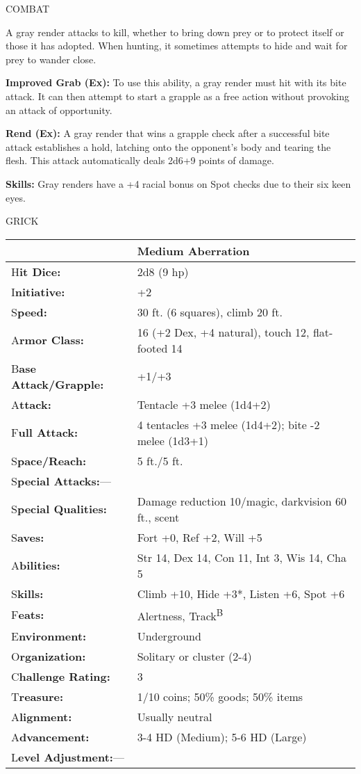 \documentclass{article}
\begin{document}
COMBAT

A gray render attacks to kill, whether to bring down prey or to protect itself 
or those it has adopted. When hunting, it sometimes attempts to hide and wait for 
prey to wander close.

\textbf{Improved Grab (Ex): }To use this ability, a gray render must hit with its 
bite attack. It can then attempt to start a grapple as a free action without provoking 
an attack of opportunity.

\textbf{Rend (Ex):} A gray render that wins a grapple check after a successful 
bite attack establishes a hold, latching onto the opponent's body and tearing the 
flesh. This attack automatically deals 2d6+9 points of damage.

\textbf{Skills:} Gray renders have a +4 racial bonus on Spot checks due to their 
six keen eyes.

\vspace{12pt}
{\LARGE{}GRICK}

\begin{tabular}{|>{\raggedright}p{91pt}|>{\raggedright}p{209pt}|}
\hline
  & Medium Aberration\tabularnewline
\hline
H\textbf{it Dice:} & 2d8 (9 hp)\tabularnewline
\hline
I\textbf{nitiative:} & +2\tabularnewline
\hline
S\textbf{peed:} & 30 ft. (6 squares), climb 20 ft.\tabularnewline
\hline
A\textbf{rmor Class:} & 16 (+2 Dex, +4 natural), touch 12, flat-footed 14\tabularnewline
\hline
B\textbf{ase Attack/Grapple:} & +1/+3\tabularnewline
\hline
A\textbf{ttack:} & Tentacle +3 melee (1d4+2)\tabularnewline
\hline
F\textbf{ull Attack:} & 4 tentacles +3 melee (1d4+2); bite -2 melee (1d3+1)\tabularnewline
\hline
S\textbf{pace/Reach:} & 5 ft./5 ft.\tabularnewline
\hline
S\textbf{pecial Attacks:}--- & \tabularnewline
\hline
S\textbf{pecial Qualities:} & Damage reduction 10/magic, darkvision 60 ft., scent\tabularnewline
\hline
S\textbf{aves:} & Fort +0, Ref +2, Will +5\tabularnewline
\hline
A\textbf{bilities:} & Str 14, Dex 14, Con 11, Int 3, Wis 14, Cha 5\tabularnewline
\hline
S\textbf{kills:} & Climb +10, Hide +3*, Listen +6, Spot +6\tabularnewline
\hline
F\textbf{eats:} & Alertness, Track\textsuperscript{B}\tabularnewline
\hline
E\textbf{nvironment:} & Underground\tabularnewline
\hline
O\textbf{rganization:} & Solitary or cluster (2-4)\tabularnewline
\hline
C\textbf{hallenge Rating:} & 3\tabularnewline
\hline
T\textbf{reasure:} & 1/10 coins; 50\% goods; 50\% items\tabularnewline
\hline
A\textbf{lignment:} & Usually neutral\tabularnewline
\hline
A\textbf{dvancement:} & 3-4 HD (Medium); 5-6 HD (Large)\tabularnewline
\hline
L\textbf{evel Adjustment:}--- & \tabularnewline
\hline
\end{tabular}
\end{document}
